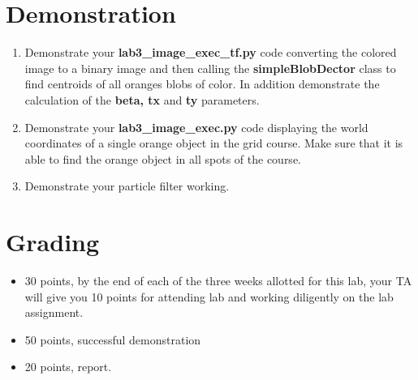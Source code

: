 \section{Demonstration}
\begin{enumerate}
\item Demonstrate your \textbf{lab3\_image\_exec\_tf.py} code converting the colored image to a binary image and then calling the \textbf{simpleBlobDector} class to find centroids of all oranges blobs of color.  In addition demonstrate the calculation of the \textbf{beta, tx} and \textbf{ty} parameters.  
\item Demonstrate your \textbf{lab3\_image\_exec.py} code displaying the world coordinates of a single orange object in the grid course.  Make sure that it is able to find the orange object in all spots of the course.  
\item Demonstrate your particle filter working.  
\end{enumerate}

\section{Grading}
\begin{itemize}
\item 30 points, by the end of each of the three weeks allotted for this lab, your TA will give you 10 points for attending lab and working diligently on the lab assignment.
\item 50 points, successful demonstration
\item 20 points, report.  
\end{itemize}
